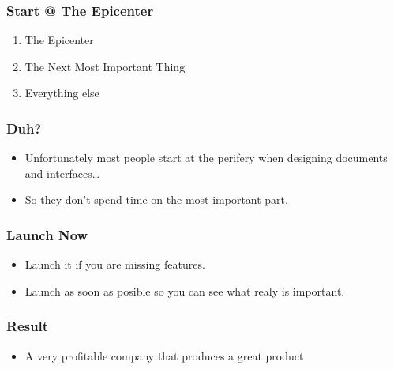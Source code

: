 \documentclass{beamer}
\begin{document}
\begin{frame}
  \frametitle{Start @ The Epicenter}
  \begin{enumerate}
  \item The Epicenter
  \item The Next Most Important Thing
  \item Everything else
  \end{enumerate}
\end{frame}
\begin{frame}
  \frametitle{Duh?}
  \begin{itemize}
  \item Unfortunately most people start at the perifery
    when designing documents and interfaces\ldots
  \item So they don't spend time on the most important part.
  \end{itemize}
\end{frame}
\begin{frame}
  \frametitle{Launch Now}
  \begin{itemize}
  \item Launch it if you are missing features.
  \item Launch as soon as posible so you can see what realy is important.
  \end{itemize}
\end{frame}
\begin{frame}
  \frametitle{Result}
  \begin{itemize}
  \item A very profitable company that produces a great product
  \end{itemize}
\end{frame}
\end{document}
